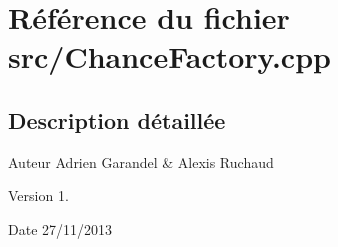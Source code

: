 \section{Référence du fichier src/\-Chance\-Factory.cpp}
\label{_chance_factory_8cpp}


\subsection{Description détaillée}
\begin{DoxyAuthor}{Auteur}
Adrien Garandel \& Alexis Ruchaud 
\end{DoxyAuthor}
\begin{DoxyVersion}{Version}
1. 
\end{DoxyVersion}
\begin{DoxyDate}{Date}
27/11/2013 
\end{DoxyDate}
